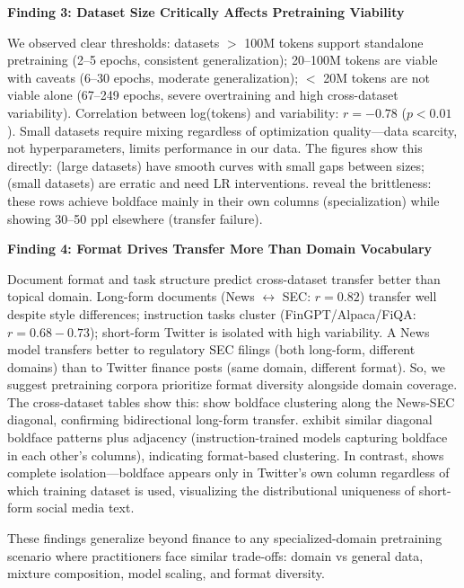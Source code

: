 \textbf{Finding 3: Dataset Size Critically Affects Pretraining Viability}

We observed clear thresholds: datasets $>$ 100M tokens support standalone pretraining (2–5 epochs, consistent generalization); 20–100M tokens are viable with caveats (6–30 epochs, moderate generalization); $<$ 20M tokens are not viable alone (67–249 epochs, severe overtraining and high cross-dataset variability). Correlation between log(tokens) and variability: $r = -0.78$ ($p < 0.01$). Small datasets require mixing regardless of optimization quality—data scarcity, not hyperparameters, limits performance in our data. The figures show this directly:  (large datasets) have smooth curves with small gaps between sizes;  (small datasets) are erratic and need LR interventions.  reveal the brittleness: these rows achieve boldface mainly in their own columns (specialization) while showing 30–50 ppl elsewhere (transfer failure).

\textbf{Finding 4: Format Drives Transfer More Than Domain Vocabulary}

Document format and task structure predict cross-dataset transfer better than topical domain. Long-form documents (News $\leftrightarrow$ SEC: $r = 0.82$) transfer well despite style differences; instruction tasks cluster (FinGPT/Alpaca/FiQA: $r = 0.68-0.73$); short-form Twitter is isolated with high variability. A News model transfers better to regulatory SEC filings (both long-form, different domains) than to Twitter finance posts (same domain, different format). So, we suggest pretraining corpora prioritize format diversity alongside domain coverage. The cross-dataset tables show this:  show boldface clustering along the News-SEC diagonal, confirming bidirectional long-form transfer.  exhibit similar diagonal boldface patterns plus adjacency (instruction-trained models capturing boldface in each other's columns), indicating format-based clustering. In contrast,  shows complete isolation—boldface appears only in Twitter's own column regardless of which training dataset is used, visualizing the distributional uniqueness of short-form social media text.

These findings generalize beyond finance to any specialized-domain pretraining scenario where practitioners face similar trade-offs: domain vs general data, mixture composition, model scaling, and format diversity.

